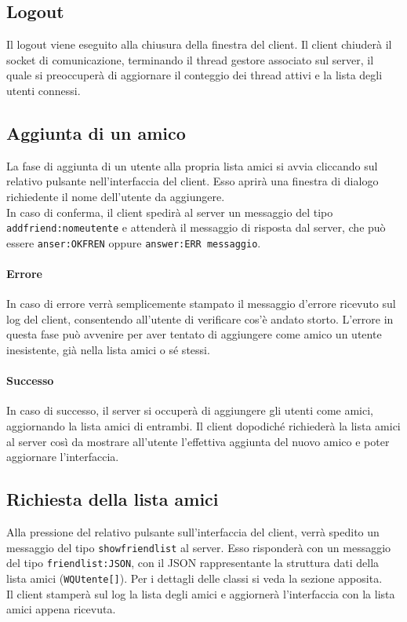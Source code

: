 \documentclass[10pt]{article}
\begin{document}
{\subsection{Logout}
Il logout viene eseguito alla chiusura della finestra del client. Il client chiuderà il socket di comunicazione, terminando il thread gestore associato sul server, il quale si preoccuperà di aggiornare il conteggio dei thread attivi e la lista degli utenti connessi.

\subsection{Aggiunta di un amico}
La fase di aggiunta di un utente alla propria lista amici si avvia cliccando sul relativo pulsante nell'interfaccia del client. Esso aprirà una finestra di dialogo richiedente il nome dell'utente da aggiungere.\\
In caso di conferma, il client spedirà al server un messaggio del tipo \texttt{addfriend:nomeutente} e attenderà il messaggio di risposta dal server, che può essere \texttt{anser:OKFREN} oppure \texttt{answer:ERR messaggio}.
\paragraph{Errore} In caso di errore verrà semplicemente stampato il messaggio d'errore ricevuto sul log del client, consentendo all'utente di verificare cos'è andato storto. L'errore in questa fase può avvenire per aver tentato di aggiungere come amico un utente inesistente, già nella lista amici o sé stessi.
\paragraph{Successo} In caso di successo, il server si occuperà di aggiungere gli utenti come amici, aggiornando la lista amici di entrambi. Il client dopodiché richiederà la lista amici al server così da mostrare all'utente l'effettiva aggiunta del nuovo amico e poter aggiornare l'interfaccia.

\subsection{Richiesta della lista amici}
Alla pressione del relativo pulsante sull'interfaccia del client, verrà spedito un messaggio del tipo \texttt{showfriendlist} al server. Esso risponderà con un messaggio del tipo \texttt{friendlist:JSON}, con il JSON rappresentante la struttura dati della lista amici (\texttt{WQUtente[]}). Per i dettagli delle classi si veda la sezione apposita.\\
Il client stamperà sul log la lista degli amici e aggiornerà l'interfaccia con la lista amici appena ricevuta.

}
\end{document}
